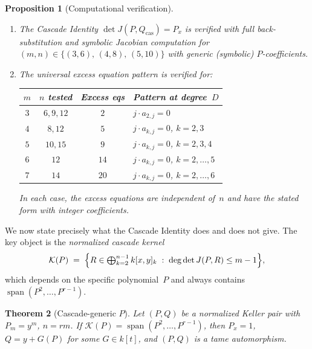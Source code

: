 \documentclass[12pt,a4paper]{article}
\newtheorem{theorem}{Theorem}[section]
\newtheorem{proposition}[theorem]{Proposition}
\theoremstyle{definition}
\newcommand{\kk}{k}
\begin{document}
\begin{proposition}[Computational verification]%
\label{prop:cascade-conj-verified}
\leavevmode
\begin{enumerate}
\item[\textup{(a)}]
  The Cascade Identity $\det J(P, Q_{\mathrm{cas}}) = P_x$
  is verified with full back-substitution and symbolic
  Jacobian computation for
  $(m, n) \in \{(3,6),\, (4,8),\, (5,10)\}$
  with generic \textup{(}symbolic\textup{)} $P$-coefficients.
\item[\textup{(b)}]
  The universal excess equation pattern is verified for:
  \begin{center}
  \begin{tabular}{cccl}
  \hline
  $m$ & $n$ tested & Excess eqs & Pattern at degree~$D$ \\
  \hline
  $3$ & $6, 9, 12$  & $2$  & $j \cdot a_{2,j} = 0$ \\
  $4$ & $8, 12$     & $5$  & $j \cdot a_{k,j} = 0$,\; $k = 2,3$ \\
  $5$ & $10, 15$    & $9$  & $j \cdot a_{k,j} = 0$,\; $k = 2,3,4$ \\
  $6$ & $12$        & $14$ & $j \cdot a_{k,j} = 0$,\; $k = 2,\ldots,5$ \\
  $7$ & $14$        & $20$ & $j \cdot a_{k,j} = 0$,\; $k = 2,\ldots,6$ \\
  \hline
  \end{tabular}
  \end{center}
  In each case, the excess equations are independent of~$n$
  and have the stated form with integer coefficients.
\end{enumerate}
\end{proposition}

We now state precisely what the Cascade Identity does and does not
give. The key object is the \emph{normalized cascade kernel}
\[
  \mathcal{K}(P) \;=\; \Bigl\{ R \in \textstyle\bigoplus_{k=2}^{n-1} \kk[x,y]_k
  \;:\; \deg \det J(P, R) \leq m-1 \Bigr\},
\]
which depends on the specific polynomial~$P$ and always contains
$\operatorname{span}(P^2, \ldots, P^{r-1})$.

\begin{theorem}[Cascade-generic $P$]\label{thm:generic-kernel}
Let $(P,Q)$ be a normalized Keller pair with $P_m = y^m$, $n = rm$.
If $\mathcal{K}(P) = \operatorname{span}(P^2, \ldots, P^{r-1})$,
then $P_x = 1$, $Q = y + G(P)$ for some $G \in \kk[t]$, and
$(P,Q)$ is a tame automorphism.
\end{theorem}
\end{document}
